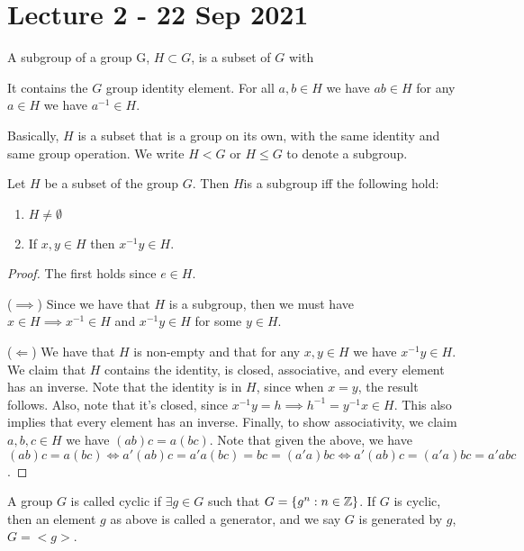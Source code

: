 \section{Lecture 2 - 22 Sep 2021}
 \begin{definition}
   A subgroup of a group G, $H\subset G$, is a subset of $G$ with 
   \begin{itemize}
       \ii It contains the $G$ group identity element.
       \ii For all $a,b\in H$ we have $ab\in H$
       \ii for any $a\in H$ we have $a^{-1}\in H$.
   \end{itemize}
   \label{subgroup}
 \end{definition}
Basically, $H$ is a subset that is a group on its own, with the same identity and same
group operation. We write $H<G$ or $H\leq G$ to denote a subgroup.

\begin{proposition}
  Let $H$ be a subset of the group $G$. Then $H$is a subgroup iff the following hold:
  \begin{enumerate}
    \item $H\neq\emptyset$
    \item If $x,y\in H$ then $x^{-1}y\in H$.
  \end{enumerate}
  \label{subgroupTest}
\end{proposition}
\begin{proof}
  The first holds since $e\in H$. 

  ($\implies$) Since we have that $H$ is a subgroup, then we must have $x\in H \implies
  x^{-1}\in H$ and $x^{-1}y\in H$ for some $y\in H$.

  ($\Leftarrow$) We have that $H$ is non-empty and that for any $x,y\in H$ we have
  $x^{-1}y\in H$. We claim that $H$ contains the identity, is closed, associative, and
  every element has an inverse. Note that the identity is in $H$, since when $x=y$, the
  result follows. Also, note that it's closed, since $x^{-1}y=h\implies
  h^{-1}=y^{-1}x\in H$. This also implies that every element has an inverse. Finally, to
  show associativity, we claim $a,b,c\in H$ we have $(ab)c=a(bc)$. Note that given the
  above, we have $(ab)c=a(bc)\iff a'(ab)c=a'a(bc)=bc=(a'a)bc \iff a'(ab)c=(a'a)bc= a'abc$.
\end{proof}

\begin{definition}
  A group $G$ is called cyclic if $\exists g\in G$ such that $G=\left\{ g^n : n\in\mathbb Z
  \right\}$. If $G$ is cyclic, then an element $g$ as above is called a generator, and we
  say $G$ is generated by $g$, $G=<g>$.
  \label{cyclicGroup}
\end{definition}

